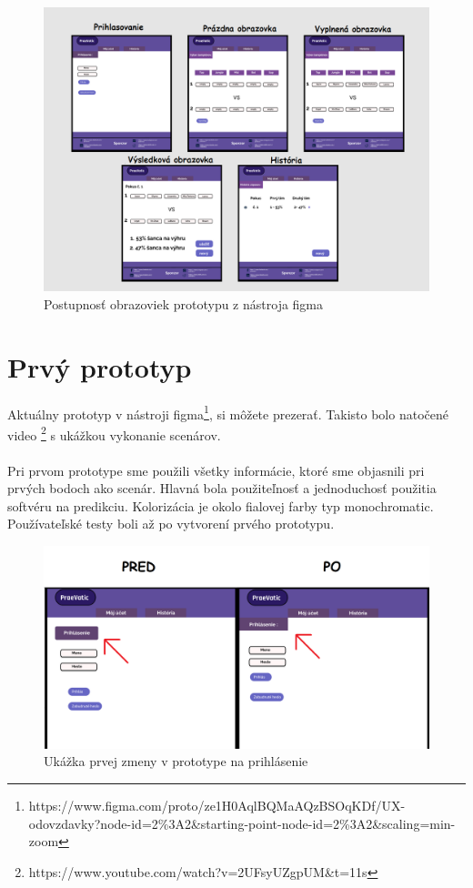 \begin{figure}[h!]
	
	\includegraphics[width=.9\textwidth]{figures/postupnost}
	
	\centering
	
	\caption{ Postupnosť obrazoviek prototypu z nástroja figma \label{jednanula}}
	
\end{figure}

\section{Prvý prototyp}

Aktuálny prototyp v nástroji figma\footnote{https://www.figma.com/proto/ze1H0AqlBQMaAQzBSOqKDf/UX-odovzdavky?node-id=2\%3A2\&starting-point-node-id=2\%3A2\&scaling=min-zoom}, si môžete prezerať.  
Takisto bolo natočené video \footnote{https://www.youtube.com/watch?v=2UFsyUZgpUM\&t=11s} s ukážkou vykonanie scenárov.
\\ \\
Pri prvom prototype sme použili všetky informácie, ktoré sme objasnili pri prvých bodoch ako scenár. Hlavná bola použiteľnosť a jednoduchosť použitia softvéru na predikciu. Kolorizácia je okolo fialovej farby typ monochromatic. Používateľské testy boli až po vytvorení prvého prototypu. 


\begin{figure}[h!]
	
	\includegraphics[width=.9\textwidth]{figures/predtym}
	
	\centering
	
	\caption{ Ukážka prvej zmeny v prototype na prihlásenie\label{predtym}}

	
	
\end{figure}


